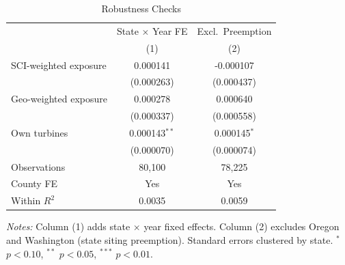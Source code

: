 \begin{table}[htbp]
\centering
\caption{Robustness Checks}
\label{tab:robustness}
\begin{threeparttable}
\begin{tabular}{lcc}
\toprule
 & State $\times$ Year FE & Excl.\ Preemption \\
 & (1) & (2) \\
\midrule
SCI-weighted exposure & 0.000141 & -0.000107 \\
 & (0.000263) & (0.000437) \\
\addlinespace
Geo-weighted exposure & 0.000278 & 0.000640 \\
 & (0.000337) & (0.000558) \\
\addlinespace
Own turbines & 0.000143$^{**}$ & 0.000145$^{*}$ \\
 & (0.000070) & (0.000074) \\
\addlinespace
\midrule
Observations & 80,100 & 78,225 \\
County FE & Yes & Yes \\
Within $R^2$ & 0.0035 & 0.0059 \\
\bottomrule
\end{tabular}
\begin{tablenotes}[flushleft]
\small
\item \textit{Notes:} Column (1) adds state $\times$ year fixed effects. Column (2) excludes Oregon and Washington (state siting preemption). Standard errors clustered by state. $^{*}$ $p<0.10$, $^{**}$ $p<0.05$, $^{***}$ $p<0.01$.
\end{tablenotes}
\end{threeparttable}
\end{table}

